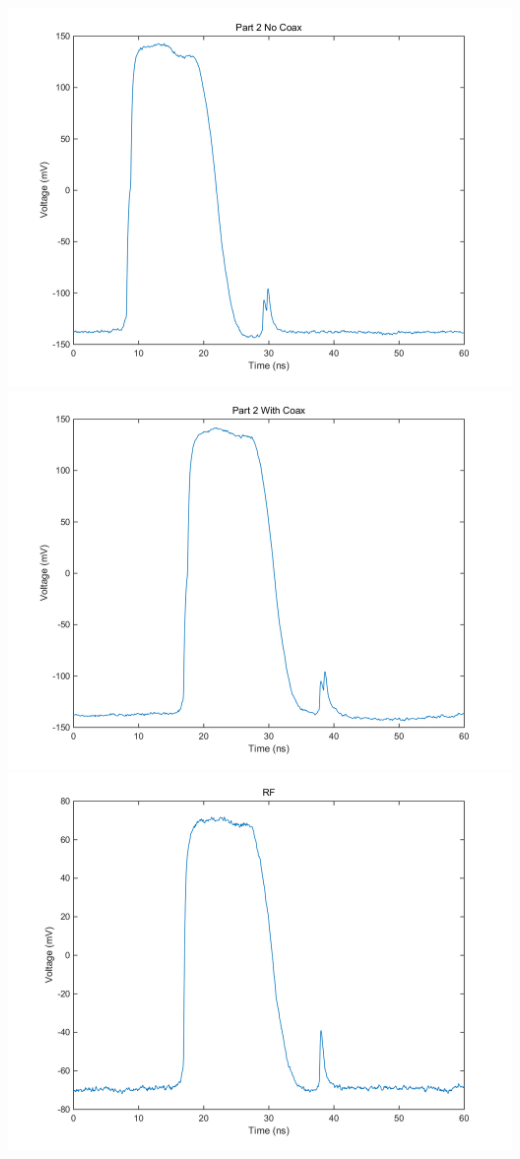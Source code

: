 \includegraphics[width=\textwidth]{plots/part_2_nocoax}
\includegraphics[width=\textwidth]{plots/part_2_withcoax}
\includegraphics[width=\textwidth]{plots/RF}
